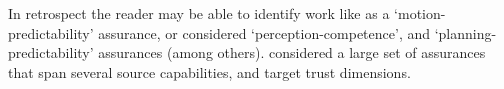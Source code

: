     In retrospect the reader may be able to identify work like \citet{Dragan2013-wd} as a `motion-predictability' assurance, or \cite{Wang2016-id} considered `perception-competence', and `planning-predictability' assurances (among others). \citet{Aitken2016-fb} considered a large set of assurances that span several source capabilities, and target trust dimensions.
